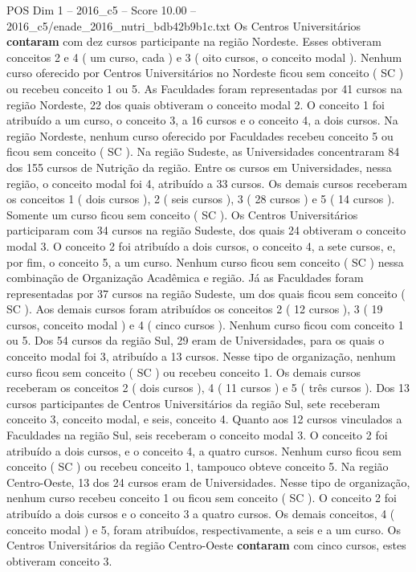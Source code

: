 \begin{textsample}{POS Dim 1 – 2016\_c5 – Score 10.00 – 2016\_c5/enade\_2016\_nutri\_bdb42b9b1c.txt}
Os Centros Universitários \textbf{contaram} com dez cursos participante na região Nordeste.
Esses obtiveram conceitos 2 e 4 ( um curso, cada ) e 3 ( oito cursos, o conceito modal ).
Nenhum curso oferecido por Centros Universitários no Nordeste ficou sem conceito ( SC ) ou recebeu conceito 1 ou 5.
As Faculdades foram representadas por 41 cursos na região Nordeste, 22 dos quais obtiveram o conceito modal 2.
O conceito 1 foi atribuído a um curso, o conceito 3, a 16 cursos e o conceito 4, a dois cursos.
Na região Nordeste, nenhum curso oferecido por Faculdades recebeu conceito 5 ou ficou sem conceito ( SC ).
Na região Sudeste, as Universidades concentraram 84 dos 155 cursos de Nutrição da região.
Entre os cursos em Universidades, nessa região, o conceito modal foi 4, atribuído a 33 cursos.
Os demais cursos receberam os conceitos 1 ( dois cursos ), 2 ( seis cursos ), 3 ( 28 cursos ) e 5 ( 14 cursos ).
Somente um curso ficou sem conceito ( SC ).
Os Centros Universitários participaram com 34 cursos na região Sudeste, dos quais 24 obtiveram o conceito modal 3.
O conceito 2 foi atribuído a dois cursos, o conceito 4, a sete cursos, e, por fim, o conceito 5, a um curso.
Nenhum curso ficou sem conceito ( SC ) nessa combinação de Organização Acadêmica e região.
Já as Faculdades foram representadas por 37 cursos na região Sudeste, um dos quais ficou sem conceito ( SC ).
Aos demais cursos foram atribuídos os conceitos 2 ( 12 cursos ), 3 ( 19 cursos, conceito modal ) e 4 ( cinco cursos ).
Nenhum curso ficou com conceito 1 ou 5.
Dos 54 cursos da região Sul, 29 eram de Universidades, para os quais o conceito modal foi 3, atribuído a 13 cursos.
Nesse tipo de organização, nenhum curso ficou sem conceito ( SC ) ou recebeu conceito 1.
Os demais cursos receberam os conceitos 2 ( dois cursos ), 4 ( 11 cursos ) e 5 ( três cursos ).
Dos 13 cursos participantes de Centros Universitários da região Sul, sete receberam conceito 3, conceito modal, e seis, conceito 4.
Quanto aos 12 cursos vinculados a Faculdades na região Sul, seis receberam o conceito modal 3.
O conceito 2 foi atribuído a dois cursos, e o conceito 4, a quatro cursos.
Nenhum curso ficou sem conceito ( SC ) ou recebeu conceito 1, tampouco obteve conceito 5.
Na região Centro-Oeste, 13 dos 24 cursos eram de Universidades.
Nesse tipo de organização, nenhum curso recebeu conceito 1 ou ficou sem conceito ( SC ).
O conceito 2 foi atribuído a dois cursos e o conceito 3 a quatro cursos.
Os demais conceitos, 4 ( conceito modal ) e 5, foram atribuídos, respectivamente, a seis e a um curso.
Os Centros Universitários da região Centro-Oeste \textbf{contaram} com cinco cursos, estes obtiveram conceito 3.

\end{textsample}
